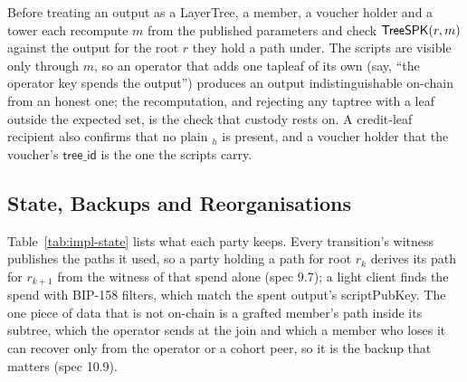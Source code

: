 Before treating an output as a LayerTree, a member, a voucher holder and
a tower each recompute $m$ from the published parameters and check
$\mathsf{TreeSPK}(r, m)$ against the output for the root $r$ they hold a path
under. The scripts are visible only through $m$, so an operator that
adds one tapleaf of its own (say, ``the operator key spends the
output'') produces an output indistinguishable on-chain from an honest
one; the recomputation, and rejecting any taptree with a leaf outside
the expected set, is the check that custody rests on. A credit-leaf
recipient also confirms that no plain $_h$ is present, and a
voucher holder that the voucher's $\mathsf{tree\_id}$ is the one the
 scripts carry.

\subsection{State, Backups and Reorganisations}\label{app:impl-state}

Table~\ref{tab:impl-state} lists what each party keeps. Every
transition's witness publishes the paths it used, so a party holding a
path for root $r_k$ derives its path for $r_{k+1}$ from the witness of
that spend alone (spec 9.7); a light client finds the spend with BIP-158
filters, which match the spent output's scriptPubKey. The one piece of
data that is not on-chain is a grafted member's path inside its subtree,
which the operator sends at the join and which a member who loses it can
recover only from the operator or a cohort peer, so it is the backup
that matters (spec 10.9).

